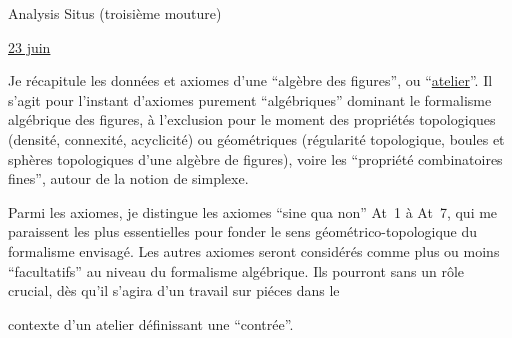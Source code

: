 \begin{center}Analysis Situs (troisième mouture)\end{center}

\uline{23 juin}

Je récapitule les données et axiomes d'une ``algèbre des figures'', ou ``\uline{atelier}''. \margin{--}Il s'agit pour l'instant d'axiomes purement ``algébriques'' dominant le formalisme algébrique des figures, à l'exclusion pour le moment des propriétés topologiques (densité, connexité, acyclicité) ou  géométriques (régularité topologique, boules et sphères topologiques d'une algèbre de figures), voire les ``propriété combinatoires fines'', autour de la notion de simplexe.

Parmi les axiomes, je distingue les axiomes ``sine qua non'' At~1 à At~7, qui me paraissent les plus essentielles pour fonder le sens géométrico-topologique du formalisme envisagé. Les autres axiomes seront considérés comme plus ou moins ``facultatifs'' au niveau du formalisme algébrique. Ils pourront sans  un rôle crucial, dès qu'il s'agira d'un travail sur piéces dans le

contexte d'un atelier définissant une ``contrée''.

